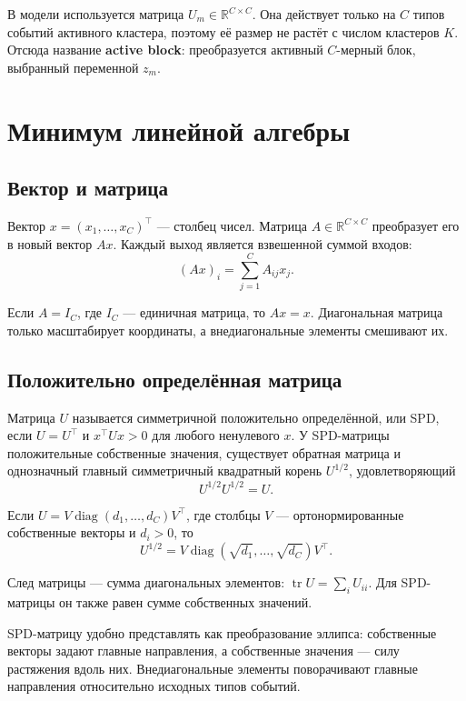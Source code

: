 \documentclass[12pt,a4paper]{article}
\DeclareMathOperator{\tr}{tr}
\DeclareMathOperator{\diag}{diag}
\newcommand{\R}{\mathbb{R}}
\newenvironment{intuitionbox}{\par\medskip\noindent{\color{blue}\bfseries Интуиция. }\ignorespaces}{\par\medskip}
\newcommand{\term}[1]{\textbf{#1}}
\begin{document}
В модели используется матрица \(U_m\in\R^{C\times C}\). Она действует только на \(C\) типов событий активного кластера, поэтому её размер не растёт с числом кластеров \(K\). Отсюда название \term{active block}: преобразуется активный \(C\)-мерный блок, выбранный переменной \(z_m\).

\section{Минимум линейной алгебры}

\subsection{Вектор и матрица}

Вектор \(x=(x_1,\ldots,x_C)^\top\) --- столбец чисел. Матрица \(A\in\R^{C\times C}\) преобразует его в новый вектор \(Ax\). Каждый выход является взвешенной суммой входов:
\begin{equation}
(Ax)_i=\sum_{j=1}^{C}A_{ij}x_j.
\end{equation}

Если \(A=I_C\), где \(I_C\) --- единичная матрица, то \(Ax=x\). Диагональная матрица только масштабирует координаты, а внедиагональные элементы смешивают их.

\subsection{Положительно определённая матрица}

Матрица \(U\) называется симметричной положительно определённой, или SPD, если \(U=U^\top\) и \(x^\top Ux>0\) для любого ненулевого \(x\). У SPD-матрицы положительные собственные значения, существует обратная матрица и однозначный главный симметричный квадратный корень \(U^{1/2}\), удовлетворяющий
\begin{equation}
U^{1/2}U^{1/2}=U.
\end{equation}

Если \(U=V\diag(d_1,\ldots,d_C)V^\top\), где столбцы \(V\) --- ортонормированные собственные векторы и \(d_i>0\), то
\begin{equation}
U^{1/2}=V\diag(\sqrt{d_1},\ldots,\sqrt{d_C})V^\top.
\end{equation}

След матрицы --- сумма диагональных элементов: \(\tr U=\sum_i U_{ii}\). Для SPD-матрицы он также равен сумме собственных значений.

\begin{intuitionbox}
SPD-матрицу удобно представлять как преобразование эллипса: собственные векторы задают главные направления, а собственные значения --- силу растяжения вдоль них. Внедиагональные элементы поворачивают главные направления относительно исходных типов событий.
\end{intuitionbox}
\end{document}
